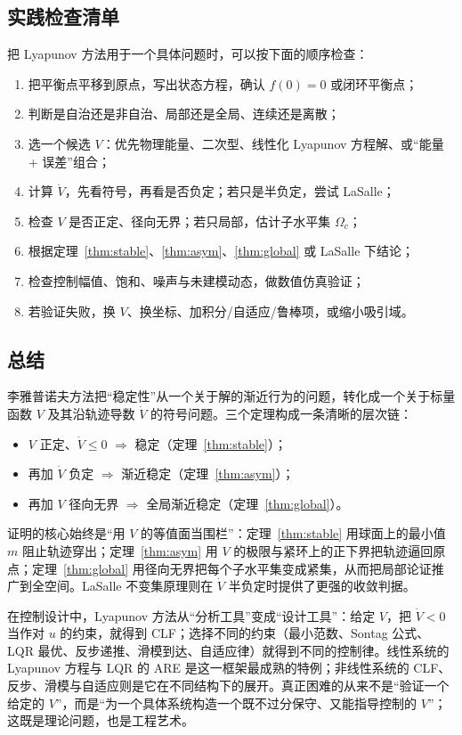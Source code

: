 \documentclass[11pt, a4paper, UTF8, fontset=none]{ctexart}
\theoremstyle{cnthm}
\begin{document}
\subsection{实践检查清单}

把 Lyapunov 方法用于一个具体问题时，可以按下面的顺序检查：
\begin{enumerate}[label=\textbf{\arabic*.}]
  \item 把平衡点平移到原点，写出状态方程，确认 $f(0)=0$ 或闭环平衡点；
  \item 判断是自治还是非自治、局部还是全局、连续还是离散；
  \item 选一个候选 $V$：优先物理能量、二次型、线性化 Lyapunov 方程解、或“能量 + 误差”组合；
  \item 计算 $\dot V$，先看符号，再看是否负定；若只是半负定，尝试 LaSalle；
  \item 检查 $V$ 是否正定、径向无界；若只局部，估计子水平集 $\Omega_c$；
  \item 根据定理~\ref{thm:stable}、\ref{thm:asym}、\ref{thm:global} 或 LaSalle 下结论；
  \item 检查控制幅值、饱和、噪声与未建模动态，做数值仿真验证；
  \item 若验证失败，换 $V$、换坐标、加积分/自适应/鲁棒项，或缩小吸引域。
\end{enumerate}

\subsection{总结}

李雅普诺夫方法把“稳定性”从一个关于解的渐近行为的问题，转化成一个关于标量函数 $V$ 及其沿轨迹导数 $\dot V$ 的符号问题。三个定理构成一条清晰的层次链：
\begin{itemize}
  \item $V$ 正定、$\dot V\le0$ $\Rightarrow$ 稳定（定理~\ref{thm:stable}）；
  \item 再加 $\dot V$ 负定 $\Rightarrow$ 渐近稳定（定理~\ref{thm:asym}）；
  \item 再加 $V$ 径向无界 $\Rightarrow$ 全局渐近稳定（定理~\ref{thm:global}）。
\end{itemize}
证明的核心始终是“用 $V$ 的等值面当围栏”：定理~\ref{thm:stable} 用球面上的最小值 $m$ 阻止轨迹穿出；定理~\ref{thm:asym} 用 $V$ 的极限与紧环上的正下界把轨迹逼回原点；定理~\ref{thm:global} 用径向无界把每个子水平集变成紧集，从而把局部论证推广到全空间。LaSalle 不变集原理则在 $\dot V$ 半负定时提供了更强的收敛判据。

在控制设计中，Lyapunov 方法从“分析工具”变成“设计工具”：给定 $V$，把 $\dot V<0$ 当作对 $u$ 的约束，就得到 CLF；选择不同的约束（最小范数、Sontag 公式、LQR 最优、反步递推、滑模到达、自适应律）就得到不同的控制律。线性系统的 Lyapunov 方程与 LQR 的 ARE 是这一框架最成熟的特例；非线性系统的 CLF、反步、滑模与自适应则是它在不同结构下的展开。真正困难的从来不是“验证一个给定的 $V$”，而是“为一个具体系统构造一个既不过分保守、又能指导控制的 $V$”；这既是理论问题，也是工程艺术。
\end{document}
